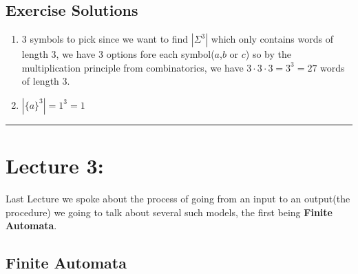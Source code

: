 \documentclass[11pt]{article}
\begin{document}
\subsection*{Exercise Solutions}
\begin{enumerate}
    \item 3 symbols to pick since we want to find $|\Sigma^3|$ which only contains words of length 3, we have 3 options fore each symbol($a$,$b$ or $c$) so by the multiplication principle from combinatorics, we have $3\cdot3\cdot3=3^3=27$ words of length 3.
    \item $|\{a\}^3|=1^3=1$
\end{enumerate}

\begin{center}
	\rule{450pt}{1pt} 
\end{center}
\newpage

\section*{Lecture 3:}
Last Lecture we spoke about the process of going from an input to an output(the procedure) we going to talk about several such models, the first being \textbf{Finite Automata}.

\subsection*{Finite Automata}
\end{document}
